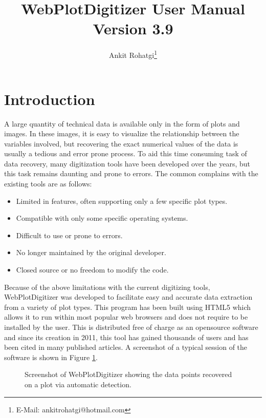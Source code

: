 \documentclass[letterpaper, 10pt]{article}
\begin{document}
\title{WebPlotDigitizer User Manual\\ Version 3.9}
\author{Ankit Rohatgi\footnote{E-Mail: ankitrohatgi@hotmail.com}}
\maketitle
\tableofcontents
\newpage
\section{Introduction}
A large quantity of technical data is available only in the form of plots and images. In these images, it is easy to visualize the relationship between the variables involved, but recovering the exact numerical values of the data is usually a tedious and error prone process. To aid this time consuming task of data recovery, many digitization tools have been developed over the years, but this task remains daunting and prone to errors. The common complains with the existing tools are as follows:

\begin{itemize}
\item{Limited in features, often supporting only a few specific plot types.}
\item{Compatible with only some specific operating systems.}
\item{Difficult to use or prone to errors.}
\item{No longer maintained by the original developer.}
\item{Closed source or no freedom to modify the code.}
\end{itemize}

Because of the above limitations with the current digitizing tools, WebPlotDigitizer was developed to facilitate easy and accurate data extraction from a variety of plot types. This program has been built using HTML5 which allows it to run within most popular web browsers and does not require to be installed by the user. This is distributed free of charge as an opensource software and since its creation in 2011, this tool has gained thousands of users and has been cited in many published articles. A screenshot of a typical session of the software is shown in Figure \ref{fig:screenshot}.

\begin{figure}
\begin{center}
\caption{Screenshot of WebPlotDigitizer showing the data points recovered on a plot via automatic detection.}
\label{fig:screenshot}
\end{center}
\end{figure}
\end{document}
